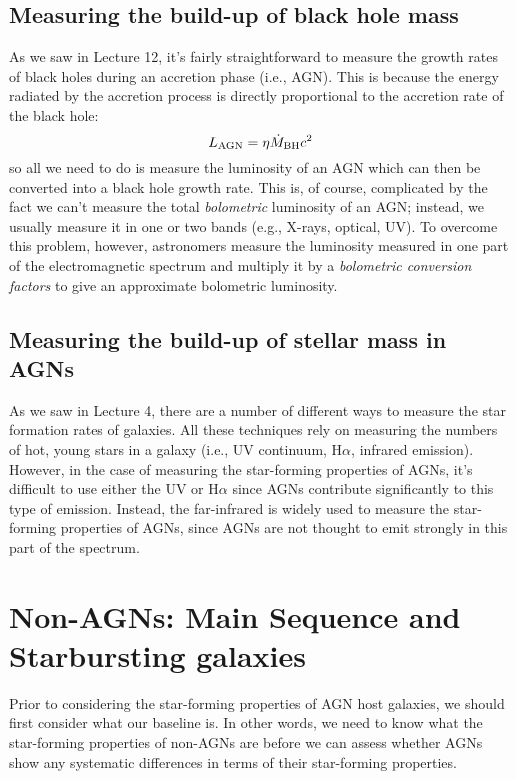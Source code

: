 \documentclass[11pt]{article}
\begin{document}
\subsection{Measuring the build-up of black hole mass}
As we saw in Lecture 12, it's fairly straightforward to measure the
growth rates of black holes during an accretion phase (i.e.,
AGN). This is because the energy radiated by the accretion process
is directly proportional to the accretion rate of the black hole:
\begin{equation}
L_{\rm AGN} = \eta \dot{M}_{\rm BH}c^2 
\end{equation}
so all we need to do is measure the luminosity of an AGN which can
then be converted into a black hole growth rate. This is, of course,
complicated by the fact we can't measure the total {\it bolometric}
luminosity of an AGN; instead, we usually measure it in one or two
bands (e.g., X-rays, optical, UV). To overcome this problem, however,
astronomers measure the luminosity measured in one part of the
electromagnetic spectrum and multiply it by a {\it bolometric
  conversion factors} to give an approximate bolometric luminosity.

\subsection{Measuring the build-up of stellar mass in AGNs}
As we saw in Lecture 4, there are a number of different ways to
measure the star formation rates of galaxies. All these techniques
rely on measuring the numbers of hot, young stars in a galaxy (i.e.,
UV continuum, H$\alpha$, infrared emission). However, in the case of
measuring the star-forming properties of AGNs, it's difficult to use
either the UV or H$\alpha$ since AGNs contribute significantly to this
type of emission. Instead, the far-infrared is widely used to measure the
star-forming properties of AGNs, since AGNs are not thought to emit
strongly in this part of the spectrum.

\section{Non-AGNs: Main Sequence and Starbursting galaxies}
Prior to considering the star-forming properties of AGN host galaxies,
we should first consider what our baseline is. In other words, we need
to know what the star-forming properties of non-AGNs are before we can
assess whether AGNs show any systematic differences in terms of their
star-forming properties.
\end{document}
